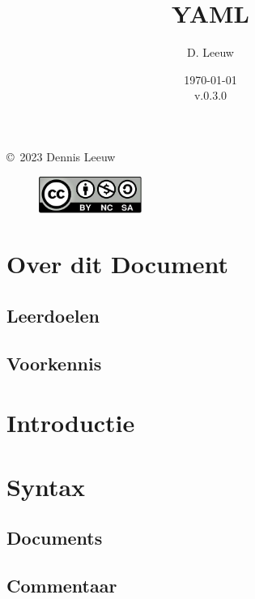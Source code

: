 \documentclass[a4paper,12pt,twoside,openright,titlepage]{book}
\author{D. Leeuw}
\title{YAML}
\date{\today\\v.0.3.0}
\begin{document}

\maketitle

\copyright\ 2023 Dennis Leeuw\\

\begin{figure}[H]
\includegraphics[width=0.3\textwidth]{CC-BY-SA-NC.png}
\end{figure}

\bigskip




\frontmatter
\chapter{Over dit Document}
\section{Leerdoelen}

\section{Voorkennis}


\tableofcontents

\mainmatter

\chapter{Introductie}


\chapter{Syntax}
\section{Documents}

\section{Commentaar}

\end{document}

